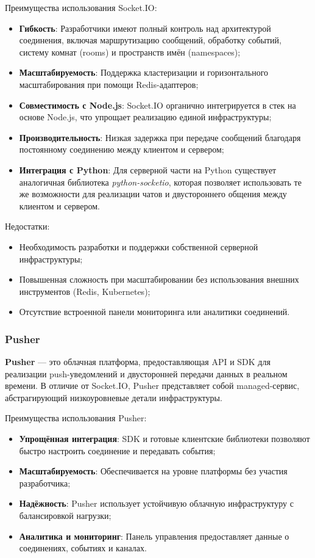 Преимущества использования Socket.IO:
\begin{itemize}
  \item \textbf{Гибкость}: Разработчики имеют полный контроль над архитектурой соединения, включая маршрутизацию сообщений, обработку событий, систему комнат (rooms) и пространств имён (namespaces);
  \item \textbf{Масштабируемость}: Поддержка кластеризации и горизонтального масштабирования при помощи Redis-адаптеров;
  \item \textbf{Совместимость с Node.js}: Socket.IO органично интегрируется в стек на основе Node.js, что упрощает реализацию единой инфраструктуры;
  \item \textbf{Производительность}: Низкая задержка при передаче сообщений благодаря постоянному соединению между клиентом и сервером;
  \item \textbf{Интеграция с Python}: Для серверной части на Python существует аналогичная библиотека \textit{python-socketio}, которая позволяет использовать те же возможности для реализации чатов и двустороннего общения между клиентом и сервером.
\end{itemize}

Недостатки:
\begin{itemize}
  \item Необходимость разработки и поддержки собственной серверной инфраструктуры;
  \item Повышенная сложность при масштабировании без использования внешних инструментов (Redis, Kubernetes);
  \item Отсутствие встроенной панели мониторинга или аналитики соединений.
\end{itemize}

\subsubsection*{Pusher}

\textbf{Pusher} --- это облачная платформа, предоставляющая API и SDK для реализации push-уведомлений и двусторонней передачи данных в реальном времени. В отличие от Socket.IO, Pusher представляет собой managed-сервис, абстрагирующий низкоуровневые детали инфраструктуры.

Преимущества использования Pusher:
\begin{itemize}
  \item \textbf{Упрощённая интеграция}: SDK и готовые клиентские библиотеки позволяют быстро настроить соединение и передавать события;
  \item \textbf{Масштабируемость}: Обеспечивается на уровне платформы без участия разработчика;
  \item \textbf{Надёжность}: Pusher использует устойчивую облачную инфраструктуру с балансировкой нагрузки;
  \item \textbf{Аналитика и мониторинг}: Панель управления предоставляет данные о соединениях, событиях и каналах.
\end{itemize}

